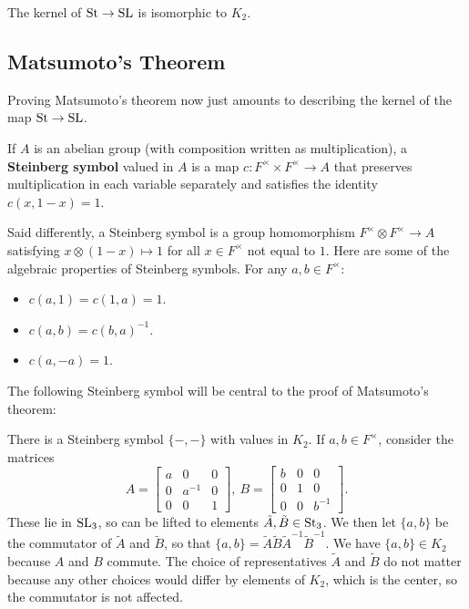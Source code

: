 \begin{corollary}
    The kernel of $\mathrm{St} \to \mathrm{SL}$ is isomorphic to $K_2$.
\end{corollary}

\subsection{Matsumoto's Theorem}
Proving Matsumoto's theorem now just amounts to describing the kernel of the map $\mathrm{St} \to \mathrm{SL}$. 
\begin{definition}
    If $A$ is an abelian group (with composition written as multiplication), a \textbf{Steinberg symbol} valued in $A$ is a map $c : F^\times \times F^\times \to A$ that preserves multiplication in each variable separately and satisfies the identity $c(x,1-x) = 1$.
\end{definition}
Said differently, a Steinberg symbol is a group homomorphism $F^\times \otimes F^\times \to A$ satisfying $x \otimes (1 - x) \mapsto 1$ for all $x \in F^\times$ not equal to $1$.
Here are some of the algebraic properties of Steinberg symbols. For any $a, b \in F^\times$:
\begin{itemize}
    \item $c(a, 1) = c(1, a) = 1$.
    \item $c(a, b) = c(b, a)^{-1}$.
    \item $c(a, -a) = 1$.
\end{itemize}
The following Steinberg symbol will be central to the proof of Matsumoto's theorem:
\begin{example}
    \label{ex:st_sym}
    There is a Steinberg symbol $\{ -, - \}$ with values in $K_2$. If $a, b \in F^\times$, consider the matrices
    \[
        A =
        \begin{bmatrix}
            a & 0 & 0 \\
            0 & a^{-1} & 0 \\
            0 & 0 & 1
        \end{bmatrix}, \
        B =
        \begin{bmatrix}
            b & 0 & 0 \\
            0 & 1 & 0 \\
            0 & 0 & b^{-1}
        \end{bmatrix}.
    \]
    These lie in $\mathrm{SL}_3$, so can be lifted to elements $\tilde{A}, \tilde{B} \in \mathrm{St}_3$. We then let $\{ a, b \}$ be the commutator of $\tilde{A}$ and $\tilde{B}$, so that $\{ a, b \} = \tilde{A} \tilde{B} \tilde{A}^{-1} \tilde{B}^{-1}$. We have $\{ a, b \} \in K_2$ because $A$ and $B$ commute. The choice of representatives $\tilde{A}$ and $\tilde{B}$ do not matter because any other choices would differ by elements of $K_2$, which is the center, so the commutator is not affected.
\end{example}
